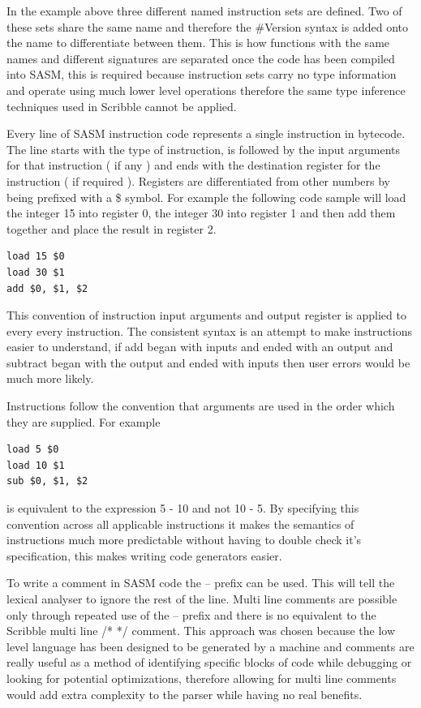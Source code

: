\documentclass[]{final_report}
\begin{document}
In the example above three different named instruction sets are defined. Two of these sets share the same name and therefore the \#Version syntax is added onto the name to differentiate between them. This is how functions with the same names and different signatures are separated once the code has been compiled into SASM, this is required because instruction sets carry no type information and operate using much lower level operations therefore the same type inference techniques used in Scribble cannot be applied.

Every line of SASM instruction code represents a single instruction in bytecode. The line starts with the type of instruction, is followed by the input arguments for that instruction ( if any ) and ends with the destination register for the instruction ( if required ). Registers are differentiated from other numbers by being prefixed with a \$ symbol. For example the following code sample will load the integer 15 into register 0, the integer 30 into register 1 and then add them together and place the result in register 2.

\begin{verbatim}
load 15 $0
load 30 $1
add $0, $1, $2
\end{verbatim}

This convention of instruction input arguments and output register is applied to every every instruction. The consistent syntax is an attempt to make instructions easier to understand, if add began with inputs and ended with an output and subtract began with the output and ended with inputs then user errors would be much more likely.

Instructions follow the convention that arguments are used in the order which they are supplied. For example 
\begin{verbatim}load 5 $0
load 10 $1
sub $0, $1, $2
\end{verbatim}
is equivalent to the expression 5 - 10 and not 10 - 5. By specifying this convention across all applicable instructions it makes the semantics of instructions much more predictable without having to double check it's specification, this makes writing code generators easier.

To write a comment in SASM code the -- prefix can be used. This will tell the lexical analyser to ignore the rest of the line. Multi line comments are possible only through repeated use of the -- prefix and there is no equivalent to the Scribble multi line /* */ comment. This approach was chosen because the low level language has been designed to be generated by a machine and comments are really useful as a method of identifying specific blocks of code while debugging or looking for potential optimizations, therefore allowing for multi line comments would add extra complexity to the parser while having no real benefits.
\end{document}
